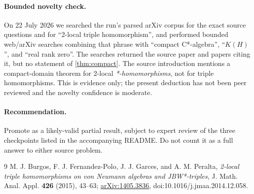 \documentclass[11pt]{article}
\theoremstyle{remark}
\begin{document}
\paragraph{Bounded novelty check.}
On 22 July 2026 we searched the run's parsed arXiv corpus for the exact source
questions and for ``2-local triple homomorphism'', and performed bounded
web/arXiv searches combining that phrase with ``compact C*-algebra'',
``$K(H)$'', and ``real rank zero''.  The searches returned the source paper
and papers citing it, but no statement of \cref{thm:compact}.  The source
introduction mentions a compact-domain theorem for 2-local
\emph{*-homomorphisms}, not for triple homomorphisms.  This is evidence only;
the present deduction has not been peer reviewed and the novelty confidence
is moderate.

\paragraph{Recommendation.}
Promote as a likely-valid partial result, subject to expert review of the
three checkpoints listed in the accompanying README.  Do not count it as a
full answer to either source problem.

\begin{thebibliography}{9}
M. J. Burgos, F. J. Fernandez-Polo, J. J. Garces, and A. M. Peralta,
\emph{2-local triple homomorphisms on von Neumann algebras and
JBW*-triples}, J. Math. Anal. Appl. \textbf{426} (2015), 43--63;
\href{https://arxiv.org/abs/1405.3836}{arXiv:1405.3836},
doi:10.1016/j.jmaa.2014.12.058.
\end{thebibliography}
\end{document}
